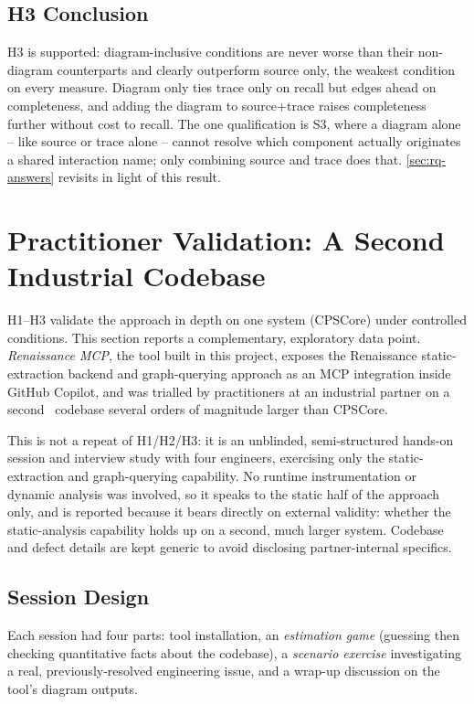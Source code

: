 \subsection{H3 Conclusion}

H3 is supported: diagram-inclusive conditions are never worse than
their non-diagram counterparts and clearly outperform source only, the
weakest condition on every measure. Diagram only ties trace only on
recall but edges ahead on completeness, and adding the diagram to
source+trace raises completeness further without cost to recall. The
one qualification is S3, where a diagram alone -- like source or trace
alone -- cannot resolve which component actually originates a shared
interaction name; only combining source and trace does that.
\cref{sec:rq-answers} revisits \rqthree in light of this result.

\section{Practitioner Validation: A Second Industrial Codebase}\label{sec:practitioner}

H1--H3 validate the approach in depth on one system (CPSCore) under
controlled conditions. This section reports a complementary, exploratory
data point. \emph{Renaissance MCP}, the tool built in this project,
exposes the Renaissance static-extraction backend and graph-querying
approach as an MCP integration inside GitHub Copilot, and was trialled
by practitioners at an industrial partner on a second \Cpp\ codebase
several orders of magnitude larger than CPSCore.

This is not a repeat of H1/H2/H3: it is an unblinded, semi-structured
hands-on session and interview study with four engineers, exercising
only the static-extraction and graph-querying capability. No runtime
instrumentation or dynamic analysis was involved, so it speaks to the
static half of the approach only, and is reported because it bears
directly on external validity: whether the static-analysis capability
holds up on a second, much larger system. Codebase and defect details
are kept generic to avoid disclosing partner-internal specifics.

\subsection{Session Design}

Each session had four parts: tool installation, an \emph{estimation
game} (guessing then checking quantitative facts about the codebase), a
\emph{scenario exercise} investigating a real, previously-resolved
engineering issue, and a wrap-up discussion on the tool's diagram
outputs.

